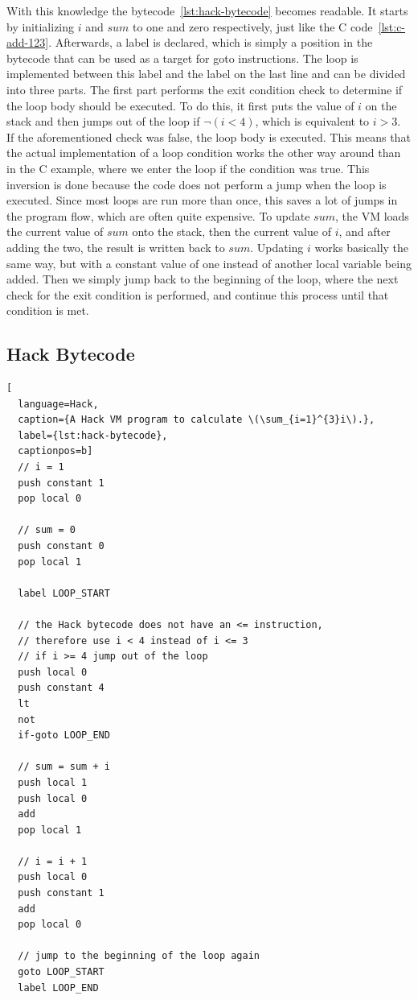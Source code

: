 With this knowledge the bytecode~\ref{lst:hack-bytecode} becomes readable.
It starts by initializing \(i\) and \(sum\) to one and zero respectively, just like the C code~\ref{lst:c-add-123}.
Afterwards, a label is declared, which is simply a position in the bytecode that can be used as a target for goto instructions.
The loop is implemented between this label and the label on the last line and can be divided into three parts.
The first part performs the exit condition check to determine if the loop body should be executed.
To do this, it first puts the value of \(i\) on the stack and then jumps out of the loop if \(\neg(i < 4)\), which is equivalent to \(i > 3\).
If the aforementioned check was false, the loop body is executed.
This means that the actual implementation of a loop condition works the other way around than in the C example, where we enter the loop if the condition was true.
This inversion is done because the code does not perform a jump when the loop is executed.
Since most loops are run more than once, this saves a lot of jumps in the program flow, which are often quite expensive.
To update \(sum\), the VM loads the current value of \(sum\) onto the stack, then the current value of \(i\), and after adding the two, the result is written back to \(sum\).
Updating \(i\) works basically the same way, but with a constant value of one instead of another local variable being added.
Then we simply jump back to the beginning of the loop, where the next check for the exit condition is performed, and continue this process until that condition is met.

\subsection{Hack Bytecode} \label{hack-bytecode}
\begin{lstlisting}[
  language=Hack,
  caption={A Hack VM program to calculate \(\sum_{i=1}^{3}i\).},
  label={lst:hack-bytecode},
  captionpos=b]
  // i = 1
  push constant 1
  pop local 0

  // sum = 0
  push constant 0
  pop local 1

  label LOOP_START

  // the Hack bytecode does not have an <= instruction,
  // therefore use i < 4 instead of i <= 3
  // if i >= 4 jump out of the loop
  push local 0
  push constant 4
  lt
  not
  if-goto LOOP_END

  // sum = sum + i
  push local 1
  push local 0
  add
  pop local 1

  // i = i + 1
  push local 0
  push constant 1
  add
  pop local 0

  // jump to the beginning of the loop again
  goto LOOP_START
  label LOOP_END
\end{lstlisting}
